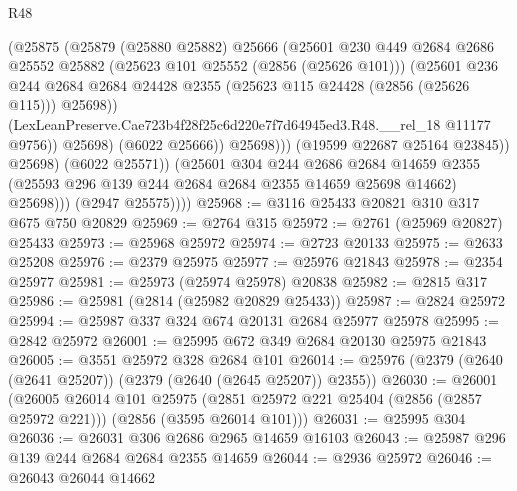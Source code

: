 \begin{lexlean}{R48}
\begin{coremodule}
                            (@25875
                              (@25879
                                (@25880 @25882)
                                @25666
                                (@25601
                                  @230
                                  @449
                                  @2684
                                  @2686
                                  @25552
                                  @25882
                                  (@25623 @101 @25552 (@2856 (@25626 @101)))
                                  (@25601
                                    @236
                                    @244
                                    @2684
                                    @2684
                                    @24428
                                    @2355
                                    (@25623 @115 @24428 (@2856 (@25626 @115)))
                                    @25698))
                                (LexLeanPreserve.Cae723b4f28f25c6d220e7f7d64945ed3.R48.__rel_18
                                  @11177
                                  @9756))
                              @25698)
                            (@6022 @25666))
                          @25698)))
                    (@19599 @22687 @25164 @23845))
                  @25698)
                (@6022 @25571))
              (@25601
                @304
                @244
                @2686
                @2684
                @14659
                @2355
                (@25593 @296 @139 @244 @2684 @2684 @2355 @14659 @25698 @14662)
                @25698)))
          (@2947 @25575))))
@25968 := @3116 @25433 @20821 @310 @317 @675 @750 @20829
@25969 := @2764 @315
@25972 := @2761 (@25969 @20827) @25433
@25973 := @25968 @25972
@25974 := @2723 @20133
@25975 := @2633 @25208
@25976 := @2379 @25975
@25977 := @25976 @21843
@25978 := @2354 @25977
@25981 := @25973 (@25974 @25978) @20838
@25982 := @2815 @317
@25986 := @25981 (@2814 (@25982 @20829 @25433))
@25987 := @2824 @25972
@25994 := @25987 @337 @324 @674 @20131 @2684 @25977 @25978
@25995 := @2842 @25972
@26001 := @25995 @672 @349 @2684 @20130 @25975 @21843
@26005 := @3551 @25972 @328 @2684 @101
@26014 := @25976 (@2379 (@2640 (@2641 @25207)) (@2379 (@2640 (@2645 @25207)) @2355))
@26030 := @26001
    (@26005
      @26014
      @101
      @25975
      (@2851 @25972 @221 @25404 (@2856 (@2857 @25972 @221)))
      (@2856 (@3595 @26014 @101)))
@26031 := @25995 @304
@26036 := @26031 @306 @2686 @2965 @14659 @16103
@26043 := @25987 @296 @139 @244 @2684 @2684 @2355 @14659
@26044 := @2936 @25972
@26046 := @26043 @26044 @14662

\end{coremodule}
\end{lexlean}

